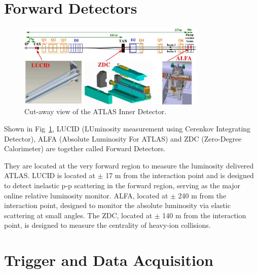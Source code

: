 \section{Forward Detectors}
\label{sec:for}
\begin{figure}[htbp]
 \begin{center}
 \includegraphics[width=0.8\textwidth]{chapters/c4/figures/forward}
 \end{center}
 \caption{Cut-away view of the ATLAS Inner Detector.}
 \label{fig:forward}
\end{figure}
\par Shown in Fig~\ref{fig:forward}, LUCID (LUminosity measurement using Cerenkov Integrating Detector), ALFA (Absolute Luminosity For ATLAS) and ZDC 
 (Zero-Degree Calorimeter) are together called Forward Detectors. 
 \par They are located at the very forward region to measure the luminosity delivered ATLAS. LUCID is located at $\pm$ 17 m from the interaction point and is designed to 
 detect inelastic p-p scattering in the forward region, serving as the major online relative luminosity monitor. 
 ALFA, located at $\pm$ 240 m from the interaction point, designed to monitor the absolute luminosity via elastic scattering at small angles. 
 The ZDC, located at $\pm$ 140 m from the interaction point, is designed to measure the centrality of heavy-ion collisions.

\section{Trigger and Data Acquisition}
\label{sec:data}

